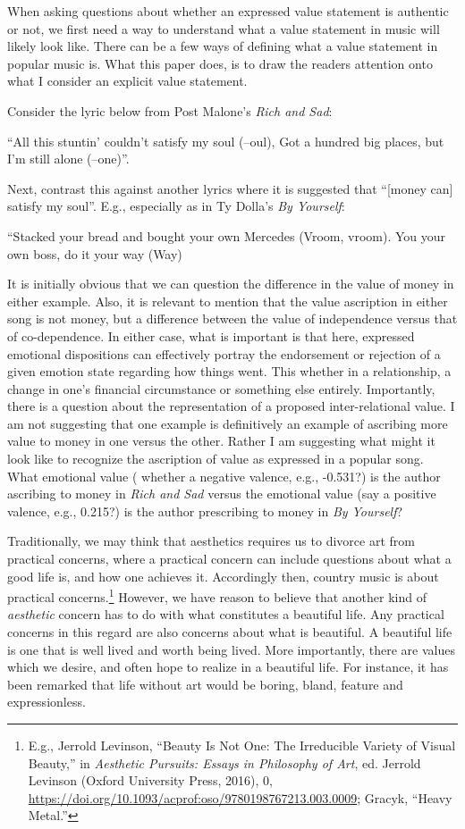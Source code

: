 \documentclass[
  12pt,
]{book}
\theoremstyle{definition}
\theoremstyle{definition}
\theoremstyle{definition}
\theoremstyle{definition}
\theoremstyle{remark}
\begin{document}
When asking questions about whether an expressed value statement is authentic or not, we first need a way to understand what a value statement in music will likely look like. There can be a few ways of defining what a value statement in popular music is. What this paper does, is to draw the readers attention onto what I consider an explicit value statement.

Consider the lyric below from Post Malone's \emph{Rich and Sad}:

\label{stuntin}
``All this stuntin' couldn't satisfy my soul (--oul), Got a hundred big places, but I'm still alone (--one)''.

Next, contrast this against another lyrics where it is suggested that ``{[}money can{]} satisfy my soul''. E.g., especially as in Ty Dolla's \emph{By Yourself}:

\label{boss}
``Stacked your bread and bought your own Mercedes (Vroom, vroom). You your own boss, do it your way (Way)

It is initially obvious that we can question the difference in the value of money in either example. Also, it is relevant to mention that the value ascription in either song is not money, but a difference between the value of independence versus that of co-dependence. In either case, what is important is that here, expressed emotional dispositions can effectively portray the endorsement or rejection of a given emotion state regarding how things went. This whether in a relationship, a change in one's financial circumstance or something else entirely. Importantly, there is a question about the representation of a proposed inter-relational value. I am not suggesting that one example is definitively an example of ascribing more value to money in one versus the other. Rather I am suggesting what might it look like to recognize the ascription of value as expressed in a popular song. What emotional value ( whether a negative valence, e.g., -0.531?) is the author ascribing to money in \emph{Rich and Sad} versus the emotional value (say a positive valence, e.g., 0.215?) is the author prescribing to money in \emph{By Yourself}?

Traditionally, we may think that aesthetics requires us to divorce art from practical concerns, where a practical concern can include questions about what a good life is, and how one achieves it. Accordingly then, country music is about practical concerns.\footnote{E.g., Jerrold Levinson, {``Beauty Is {Not One}: {The Irreducible Variety} of {Visual Beauty},''} in \emph{Aesthetic {Pursuits}: {Essays} in {Philosophy} of {Art}}, ed. Jerrold Levinson (Oxford University Press, 2016), 0, \url{https://doi.org/10.1093/acprof:oso/9780198767213.003.0009}; Gracyk, {``Heavy Metal.''}} However, we have reason to believe that another kind of \emph{aesthetic} concern has to do with what constitutes a beautiful life. Any practical concerns in this regard are also concerns about what is beautiful. A beautiful life is one that is well lived and worth being lived. More importantly, there are values which we desire, and often hope to realize in a beautiful life. For instance, it has been remarked that life without art would be boring, bland, feature and expressionless.
\end{document}
